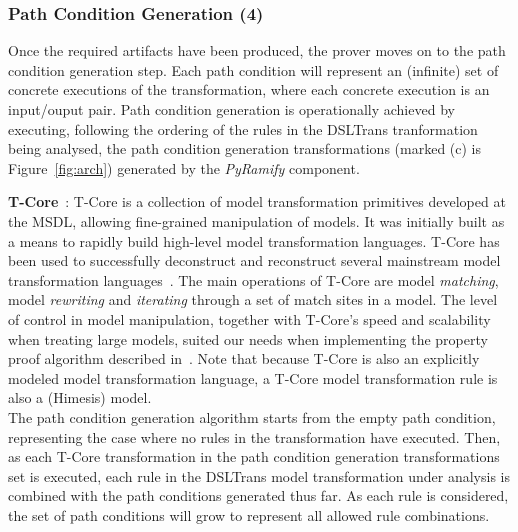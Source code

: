 


\subsubsection{Path Condition Generation (4)}

Once the required artifacts have been produced, the prover moves
on to the path condition generation step. Each path condition will represent an
(infinite) set of concrete executions of the transformation, where each concrete
execution is an input/ouput pair. Path condition generation is operationally
achieved by executing, following the ordering of the rules in the DSLTrans
tranformation being analysed, the path condition generation transformations
(marked (c) is Figure~\ref{fig:arch}) generated by the \emph{PyRamify}
component.

  \textbf{T-Core}~\cite{Syriani2010a}: T-Core is a collection of model transformation
  primitives developed at the MSDL, allowing fine-grained manipulation of
  models. It was initially built as a means to rapidly build
  high-level model transformation languages. T-Core has been used to
  successfully deconstruct and reconstruct several mainstream model transformation
  languages~\cite{}. The main operations of T-Core are model \emph{matching},
  model \emph{rewriting} and \emph{iterating} through a set of match sites in a model.
  The level of control in model manipulation, together with T-Core's speed and
  scalability when treating large models, suited our needs when
  implementing the property proof algorithm described in~\cite{Lucio2014}. Note that because
  T-Core is also an explicitly modeled model transformation language, a T-Core
  model transformation rule is also a (Himesis) model.\\



The path condition generation algorithm starts from the empty path condition,
representing the case where no rules in the transformation have executed. Then,
as each T-Core transformation in the path condition generation
transformations set is executed, each rule in the
DSLTrans model transformation under analysis is combined with the path
conditions generated thus far. As each rule is considered, the set of path
conditions will grow to represent all allowed rule combinations.

